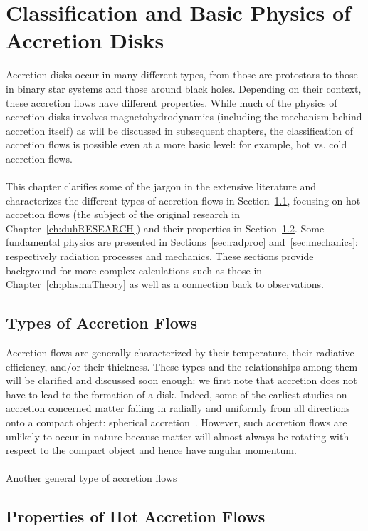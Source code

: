 \chapter{Classification and Basic Physics of Accretion Disks}
Accretion disks occur in many different types, from those are protostars to those in binary star systems and those around black holes. Depending on their context, these accretion flows have different properties. While much of the physics of accretion disks involves magnetohydrodynamics (including the mechanism behind accretion itself) as will be discussed in subsequent chapters, the classification of accretion flows is possible even at a more basic level: for example, hot vs. cold accretion flows.\\
\\
This chapter clarifies some of the jargon in the extensive literature and characterizes the different types of accretion flows in Section~\ref{sec:typesAF}, focusing on hot accretion flows (the subject of the original research in Chapter~\ref{ch:duhRESEARCH}) and their properties in Section~\ref{sec:propertiesAF}. Some fundamental physics are presented in Sections~\ref{sec:radproc} and~\ref{sec:mechanics}: respectively radiation processes and mechanics. These sections provide background for more complex calculations such as those in Chapter~\ref{ch:plasmaTheory} as well as a connection back to observations. 

\section{Types of Accretion Flows} \label{sec:typesAF}
Accretion flows are generally characterized by their temperature, their radiative efficiency, and/or their thickness. These types and the relationships among them will be clarified and discussed soon enough: we first note that accretion does not have to lead to the formation of a disk. Indeed, some of the earliest studies on accretion concerned matter falling in radially and uniformly from all directions onto a compact object: spherical accretion~\cite{Bondi?}. However, such accretion flows are unlikely to occur in nature because matter will almost always be rotating with respect to the compact object and hence have angular momentum. \\
\\
Another general type of accretion flows


\section{Properties of Hot Accretion Flows} \label{sec:propertiesAF}

